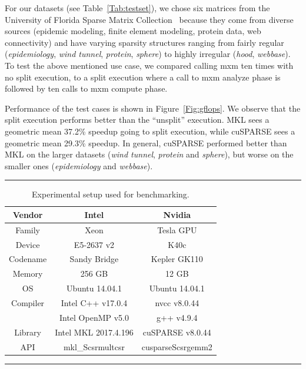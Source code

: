 For our datasets (see Table~\ref{Tab:testset}), we chose
six matrices from the University of Florida Sparse Matrix
Collection~\cite{davis2011university} because they come from diverse
sources (epidemic modeling, finite element modeling, protein data,
web connectivity) and have varying sparsity structures ranging from
fairly regular (\emph{epidemiology}, \emph{wind tunnel}, \emph{protein},
\emph{sphere}) to highly irregular (\emph{hood}, \emph{webbase}). To
test the above mentioned use case, we compared calling {\sf mxm} ten
times with no split execution, to a split execution where a call to {\sf
mxm} analyze phase is followed by ten calls to {\sf mxm} compute phase.

Performance of the test cases is shown in Figure~\ref{Fig:gflops}. We observe that the split
execution performs better than the ``unsplit'' execution. MKL sees a geometric mean
37.2\% speedup going to split execution, while cuSPARSE sees a geometric mean
29.3\% speedup. In general, cuSPARSE performed better than MKL on the
larger datasets (\emph{wind tunnel}, \emph{protein} and \emph{sphere}),
but worse on the smaller ones (\emph{epidemiology} and \emph{webbase}).

\begin{table}[tb]
	\hrule
	\caption{Experimental setup used for benchmarking.}
	\label{Tab:testbed}
	\begin{center}
		\begin{tabular}{|c|c|c|} \hline
			Vendor & Intel & Nvidia \\ \hline
			Family & Xeon & Tesla GPU \\
			Device & E5-2637 v2 & K40c \\
			Codename & Sandy Bridge & Kepler GK110 \\
			Memory & 256 GB & 12 GB \\
			OS & Ubuntu 14.04.1 & Ubuntu 14.04.1 \\
			Compiler & Intel C++ v17.0.4 & nvcc v8.0.44 \\
			& Intel OpenMP v5.0 & g++ v4.9.4 \\
			Library & Intel MKL 2017.4.196 & cuSPARSE v8.0.44 \\ 
			API & mkl\_Scsrmultcsr & cusparseScsrgemm2 \\ \hline
		\end{tabular}
	\end{center}
	\hrule
\end{table}

